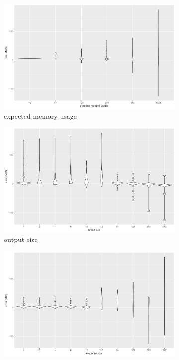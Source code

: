 \documentclass{article}
\begin{document}
\begin{figure}
  \centering
  \begin{subfigure}[t]{0.49\textwidth}
    \centering
    \includegraphics[width=\textwidth]{../io_memory_tests/plots/posterior_error_exp.png}
    \caption{expected memory usage}
    \label{fig:posterior_violin_memory}
  \end{subfigure}
  \begin{subfigure}[t]{0.49\textwidth}
    \centering
    \includegraphics[width=\textwidth]{../io_memory_tests/plots/posterior_error_output.png}
    \caption{output size}
    \label{fig:posterior_violin_output}
  \end{subfigure}
  \begin{subfigure}[t]{0.49\textwidth}
    \centering
    \includegraphics[width=\textwidth]{../io_memory_tests/plots/posterior_error_response.png}

\end{subfigure}
\end{figure}
\end{document}
